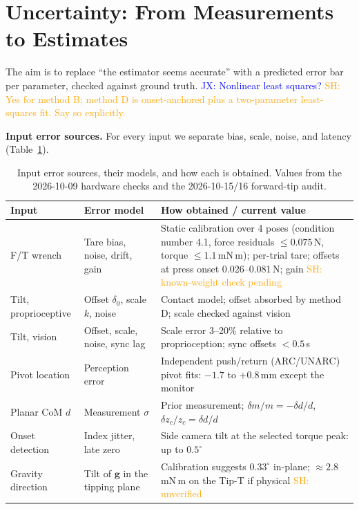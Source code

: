 \documentclass[10pt, conference]{IEEEtran}
\newcommand{\jx}[1]{\textcolor{blue}{JX: #1}}
\newcommand{\sh}[1]{\textcolor{orange}{SH: #1}}
\begin{document}
\section{Uncertainty: From Measurements to Estimates} \label{sec:uncertainty}

The aim is to replace ``the estimator seems accurate'' with a predicted error bar per parameter, checked against ground truth. \jx{Nonlinear least squares?} \sh{Yes for method B; method D is onset-anchored plus a two-parameter least-squares fit. Say so explicitly.}

\noindent \textbf{Input error sources.} For every input we separate bias, scale, noise, and latency (Table~\ref{tab:error_sources}).

\begin{table}[t]
  \centering
  \caption{Input error sources, their models, and how each is obtained. Values from the 2026-10-09 hardware checks and the 2026-10-15/16 forward-tip audit.}
  \label{tab:error_sources}
  \small
  \begin{tabular}{p{} p{} p{}}
    \toprule
    \textbf{Input} & \textbf{Error model} & \textbf{How obtained / current value} \\
    \midrule
    F/T wrench & Tare bias, noise, drift, gain & Static calibration over 4 poses (condition number 4.1, force residuals $\le0.075$\,N, torque $\le1.1$\,mN\,m); per-trial tare; offsets at press onset 0.026--0.081\,N; gain \sh{known-weight check pending} \\
    Tilt, proprioceptive & Offset $\delta_0$, scale $k$, noise & Contact model; offset absorbed by method D; scale checked against vision \\
    Tilt, vision & Offset, scale, noise, sync lag & Scale error 3--20\% relative to proprioception; sync offsets $<0.5$\,s \\
    Pivot location & Perception error & Independent push/return (ARC/UNARC) pivot fits: $-1.7$ to $+0.8$\,mm except the monitor \\
    Planar CoM $d$ & Measurement $\sigma$ & Prior measurement; $\delta m/m = -\delta d/d$, $\delta z_c/z_c = \delta d/d$ \\
    Onset detection & Index jitter, late zero & Side camera tilt at the selected torque peak: up to $0.5^\circ$ \\
    Gravity direction & Tilt of $\mathbf g$ in the tipping plane & Calibration suggests $0.33^\circ$ in-plane; $\approx2.8$\,mN\,m on the Tip-T if physical \sh{unverified} \\
    \bottomrule
  \end{tabular}
\end{table}
\end{document}
